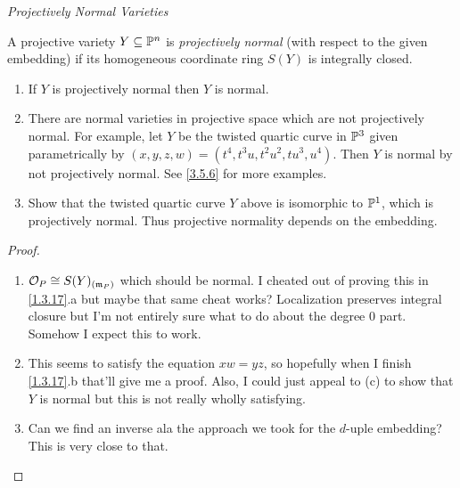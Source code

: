 \label{1.3.18}

\emph{Projectively Normal Varieties}

A projective variety $Y \subseteq \P^n$ is \emph{projectively normal} (with respect to the given embedding) if its homogeneous coordinate ring $S(Y)$ is integrally closed.

\begin{enumerate}[label = (\alph*)]
    \item If $Y$ is projectively normal then $Y$ is normal.

    \item There are normal varieties in projective space which are not projectively normal. For example, let $Y$ be the twisted quartic curve in $\P^3$ given parametrically by $(x, y, z, w) = (t^4, t^3 u, t^2 u^2, t u^3, u^4)$. Then $Y$ is normal by not projectively normal. See \ref{3.5.6} for more examples.

    \item Show that the twisted quartic curve $Y$ above is isomorphic to $\P^1$, which is projectively normal. Thus projective normality depends on the embedding.
\end{enumerate}

\begin{proof}
    \begin{enumerate}[label = (\alph*)]
        \item $\mathcal O_P \cong S(Y)_{(\m_P)}$ which should be normal. I cheated out of proving this in \ref{1.3.17}.a but maybe that same cheat works? Localization preserves integral closure but I'm not entirely sure what to do about the degree $0$ part. Somehow I expect this to work.

        \item This seems to satisfy the equation $xw = yz$, so hopefully when I finish \ref{1.3.17}.b that'll give me a proof. Also, I could just appeal to (c) to show that $Y$ is normal but this is not really wholly satisfying.

        \item Can we find an inverse ala the approach we took for the $d$-uple embedding? This is very close to that.
    \end{enumerate}
\end{proof}
